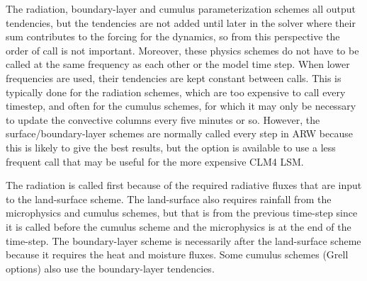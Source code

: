 The radiation, boundary-layer and cumulus parameterization schemes all
output tendencies, but the tendencies are not added until later in the solver where their
sum contributes to the forcing for the dynamics, so
from this perspective the order of call is not important. Moreover, these
physics schemes do not have to be called at the same frequency as each other
or the model time step. When lower frequencies are used, their tendencies
are kept constant between calls. This is typically done for the radiation schemes,
which are too expensive to call every timestep, and often for the cumulus schemes, for
which it may only be necessary to update the convective columns every five minutes or so. 
However, the surface/boundary-layer schemes are
normally called every step in ARW because this is likely to give the best results,
but the option is available to use a less frequent call that may be useful for the more
expensive CLM4 LSM.

The radiation is called first because of the required radiative fluxes
that are input to the land-surface scheme. The land-surface also requires rainfall
from the microphysics and cumulus schemes, but that is from the previous time-step
since it is called before the cumulus scheme and the microphysics is at the end of the time-step.
The boundary-layer scheme is necessarily after the land-surface scheme
because it requires the heat and moisture fluxes. Some cumulus schemes (Grell options)
also use the boundary-layer tendencies.

